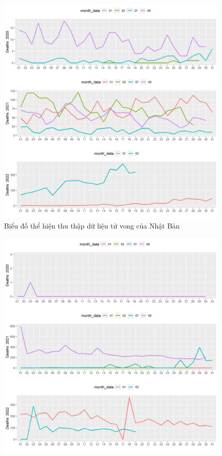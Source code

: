 \documentclass[a4paper]{article}
\theoremstyle{definition}
\begin{document}
\begin{enumerate}[i)]
\begin{enumerate}[1)]
\begin{figure}[htp]
		    \includegraphics[scale = 0.7]{Images/V/v2 Japan .jpeg}
		    \caption{Biểu đồ thể hiện thu thập dữ liệu tử vong của Nhật Bản}
		    \label{fig:my_label}
		\end{figure}
		\begin{figure}[htp]
		    \centering
		    \includegraphics[scale = 0.7]{Images/V/v2 Vietnam .jpeg}

\end{figure}
\end{enumerate}
\end{enumerate}
\end{document}
